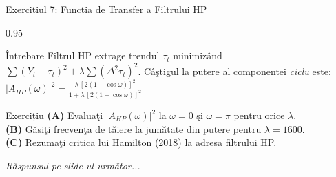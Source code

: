 \documentclass[9pt, aspectratio=169, t]{beamer}
\begin{document}
\begin{frame}{Exercițiul 7: Funcția de Transfer a Filtrului HP}
    \begin{cminipage}{0.95\textwidth}
    {\small
    \begin{alertblock}{Întrebare}
        Filtrul HP extrage trendul $\tau_t$ minimizând
        $\sum(Y_t-\tau_t)^2 + \lambda\sum(\Delta^2\tau_t)^2$.
        Câştigul la putere al componentei \emph{ciclu} este:
        $|A_{HP}(\omega)|^2 = \frac{\lambda\,[2(1-\cos\omega)]^2}{1 + \lambda\,[2(1-\cos\omega)]^2}$
    \end{alertblock}

    \vspace{0.1cm}

    \begin{block}{Exercițiu}
        \textcolor{MainBlue}{\textbf{(A)}} Evaluaţi $|A_{HP}(\omega)|^2$ la $\omega = 0$ şi $\omega = \pi$ pentru orice $\lambda$.\\[3pt]
        \textcolor{MainBlue}{\textbf{(B)}} Găsiţi frecvenţa de tăiere la jumătate din putere pentru $\lambda = 1600$.\\[3pt]
        \textcolor{MainBlue}{\textbf{(C)}} Rezumaţi critica lui Hamilton (2018) la adresa filtrului HP.
    \end{block}

    \vspace{0.1cm}
    \begin{center}
        \textit{Răspunsul pe slide-ul următor...}
    \end{center}
    }
    \end{cminipage}
\end{frame}
\end{document}
